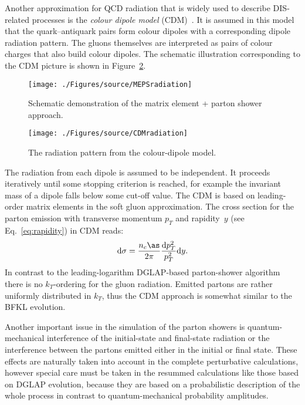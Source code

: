 Another approximation for QCD radiation that is widely used to describe DIS-related processes is the \emph{colour dipole model} (CDM)~\cite{np:b306:746,Andersson:1988ee,Andersson:1990dp,Gustafson:1992uh,Andersson:1988gp,Gustafson:1986db}. It is assumed in this model that the quark--antiquark pairs form colour dipoles with a corresponding dipole radiation pattern. The gluons themselves are interpreted as pairs of colour charges that also build colour dipoles. The schematic illustration corresponding to the CDM picture is shown in Figure~\ref{fig:cdm}. 
\begin{figure}[t]
	\centering
		\texttt{[image: ./Figures/source/MEPSradiation]}
	\caption{Schematic demonstration of the matrix element + parton shower approach.}
\label{fig:meps}
\end{figure}
\begin{figure}[t]%
\centering
\texttt{[image: ./Figures/source/CDMradiation]}%
\caption{The radiation pattern from the colour-dipole model.}%
\label{fig:cdm}%
\end{figure}
The radiation from each dipole is assumed to be independent. It proceeds iteratively until some stopping criterion is reached, for example the invariant mass of a dipole falls below some cut-off  value. The CDM is based on leading-order matrix elements in the soft gluon approximation. The cross section for the parton emission with transverse momentum $p_T$ and rapidity~$y$ (see Eq.~\eqref{eq:rapidity}) in CDM reads:
\begin{equation}
\mathrm{d}\sigma = \frac{n_c\as}{2\pi}\frac{\mathrm{d}p_T^2}{p_T^2}\mathrm{d}y.
\end{equation}
In contrast to the leading-logarithm DGLAP-based parton-shower algorithm there is no $k_T$-ordering for the gluon radiation. Emitted partons are rather uniformly distributed in $k_T$, thus the CDM approach is somewhat similar to the BFKL evolution.

Another important issue in the simulation of the parton showers is quantum-mechanical interference of the initial-state and final-state radiation or the interference between the partons emitted either in the initial or final state. These effects are naturally taken into account in the complete perturbative calculations, however special care must be taken in the resummed calculations like those based on DGLAP evolution, because they are based on a probabilistic description of the whole process in contrast to quantum-mechanical probability amplitudes.

